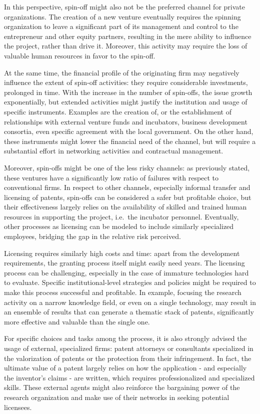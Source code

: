 In this perspective, spin-off might also not be the preferred channel for private organizations. The creation of a new venture eventually requires the spinning organization to leave a significant part of its management and control to the entrepreneur and other equity partners, resulting in the mere ability to influence the project, rather than drive it. Moreover, this activity may require the loss of valuable human resources in favor to the spin-off. 

At the same time, the financial profile of the originating firm may negatively influence the extent of spin-off activities: they require considerable investments, prolonged in time. With the increase in the number of spin-offs, the issue growth exponentially, but extended activities might justify the institution and usage of specific instruments. Examples are the creation of, or the establishment of relationships with external venture funds and incubators, business development consortia, even specific agreement with the local government. On the other hand, these instruments might lower the financial need of the channel, but will require a substantial effort in networking activities and contractual management.

Moreover, spin-offs might be one of the less risky channels: as previously stated, these ventures have a significantly low ratio of failures with respect to conventional firms. In respect to other channels, especially informal transfer and licensing of patents, spin-offs can be considered a safer but profitable choice, but their effectiveness largely relies on the availability of skilled and trained human resources in supporting the project, i.e.\ the incubator personnel. Eventually, other processes as licensing can be modeled to include similarly specialized employees, bridging the gap in the relative risk perceived.

Licensing requires similarly high costs and time: apart from the development requirements, the granting process itself might easily need years. The licensing process can be challenging, especially in the case of immature technologies hard to evaluate. Specific institutional-level strategies and policies might be required to make this process successful and profitable. In example, focusing the research activity on a narrow knowledge field, or even on a single technology, may result in an ensemble of results that can generate a thematic stack of patents, significantly more effective and valuable than the single one.

For specific choices and tasks among the process, it is also strongly advised the usage of external, specialized firms: patent attorneys or consultants specialized in the valorization of patents or the protection from their infringement. In fact, the ultimate value of a patent largely relies on how the application - and especially the inventor's claims - are written, which requires professionalized and specialized skills. These external agents might also reinforce the bargaining power of the research organization and make use of their networks in seeking potential licensees. 

